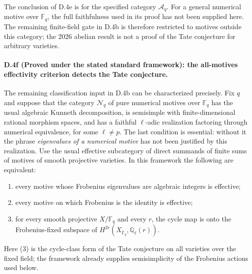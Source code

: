 The conclusion of D.4e is for the specified category $\mathcal A_q$.
For a general numerical motive over $\mathbb F_q$, the full
faithfulness used in its proof has not been supplied here. The
remaining finite-field gate in D.4b is therefore restricted to
motives outside this category; the 2026 abelian result is not a
proof of the Tate conjecture for arbitrary varieties.

\paragraph{D.4f (Proved under the stated standard framework): the all-motives effectivity criterion detects the Tate conjecture.}
The remaining classification input in D.4b can be characterized
precisely. Fix $q$ and suppose that the category $\mathcal N_q$ of
pure numerical motives over $\mathbb F_q$ has the usual algebraic
Kunneth decomposition, is semisimple with finite-dimensional
rational morphism spaces, and has a faithful $\ell$-adic
realization factoring through numerical equivalence, for some
$\ell\ne p$. The last condition is essential: without it the
phrase \emph{eigenvalues of a numerical motive} has not been
justified by this realization.
Use the usual effective subcategory of direct summands of finite
sums of motives of smooth projective varieties. In this framework
the following are equivalent:
\begin{enumerate}
\item every motive whose Frobenius eigenvalues are algebraic
integers is effective;
\item every motive on which Frobenius is the identity is effective;
\item for every smooth projective $X/\mathbb F_q$ and every $r$,
the cycle map is onto the Frobenius-fixed subspace of
$H^{2r}(X_{\overline{\mathbb F}_q},\mathbb Q_\ell(r))$.
\end{enumerate}
Here (3) is the cycle-class form of the Tate conjecture on all
varieties over the fixed field; the framework already supplies
semisimplicity of the Frobenius actions used below.

